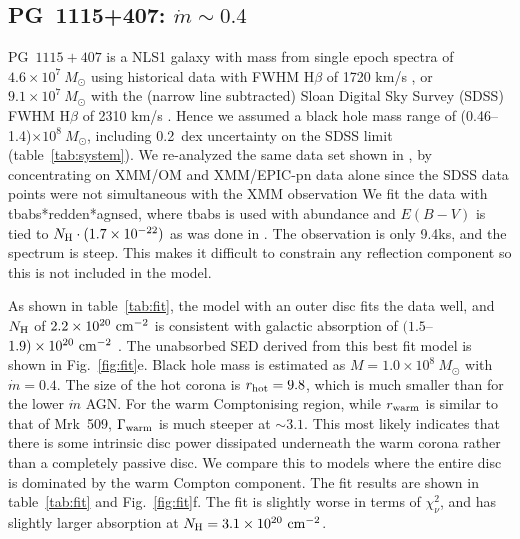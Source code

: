 \documentclass[a4paper,fleqn,usenatbib]{mnras}
\begin{document}
 \subsection{PG~1115+407: $\dot{m}\sim 0.4$}
\label{sec:pg1115}

PG~$1115+407$ is a NLS1 galaxy with mass from single epoch spectra of
$4.6\times 10^7~M_\odot$ using historical data with FWHM H$\beta$ of
1720 km/s \citep{porquet2004}, or $9.1\times 10^7~M_\odot$ with the
(narrow line subtracted) Sloan Digital Sky Survey (SDSS) FWHM H$\beta$ of 2310 km/s
\citep{jin2012a}. Hence we assumed a black hole mass range of 
(0.46--1.4)$\times 10^8~M_\odot$, including 0.2~dex uncertainty on the
SDSS limit (table~\ref{tab:system}).
We re-analyzed the same data set shown in \cite{jin2012a,jin2012b}, by concentrating on 
XMM/OM and XMM/EPIC-pn data alone since the SDSS data points 
were not simultaneous with the XMM observation
We fit the data with {\sc tbabs*redden*agnsed}, where {\sc tbabs} is used with 
\cite{anders1982} abundance and $E(B-V)$ is tied to 
$N_{\rm H}\cdot (1.7 \times10^{-22})$ as was done in \cite{jin2012a}. The observation is only 9.4ks, and the spectrum is 
steep.  This makes it difficult to constrain any reflection component so this is not included in the model.

As shown in table~\ref{tab:fit}, the model with an outer disc 
fits the data well, and $N_{\rm H}$ of $2.2\times 10^{20}~{\rm cm^{-2}}$ is consistent 
with galactic absorption of $(1.5$--$1.9)\times 10^{20}~{\rm cm^{-2}}$ \citep{kalberla2005,dickey1990}.
The unabsorbed SED derived from this best fit model is shown in Fig.~\ref{fig:fit}e.
Black hole mass is estimated as $M=1.0\times 10^8~M_\odot$ with
$\dot{m}=0.4$.
The size of the hot corona is $r_{\rm hot}=9.8$, which is much smaller  
than for the lower $\dot{m}$ AGN. 
For the warm Comptonising region, while 
$r_{\rm warm}$ is similar to that of Mrk~509, $\Gamma_{\rm warm}$ is much steeper at $\sim3.1$.
This most likely indicates that there is some intrinsic disc power dissipated 
underneath the warm corona rather than a completely passive disc. 
We compare this to models where the entire disc is dominated
by the warm Compton component. The fit results are shown in table~\ref{tab:fit} and Fig.~\ref{fig:fit}f.
The fit  is slightly worse in terms of $\chi_\nu^2$, and has slightly larger 
absorption at $N_{\rm H}=3.1\times 10^{20}~{\rm cm^{-2}}$.
\end{document}
